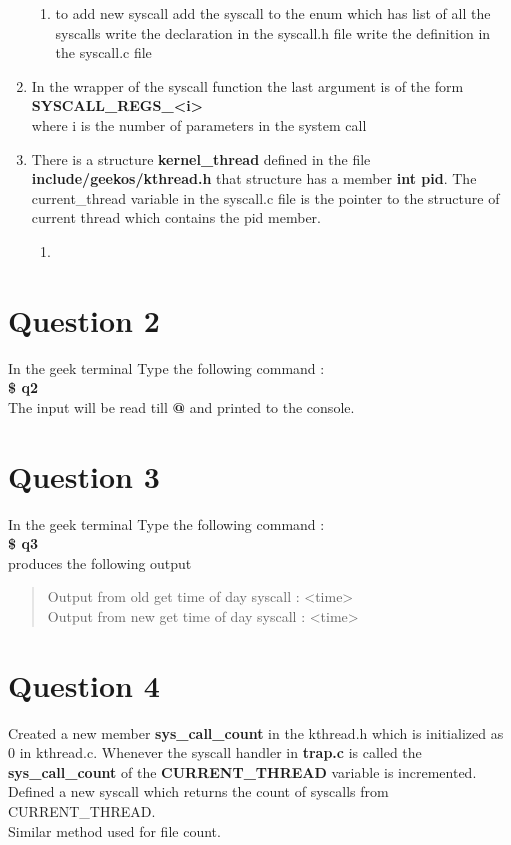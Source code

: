 \documentclass[11pt]{article}
\begin{document}
\begin{enumerate}
\begin{enumerate}
\item to add new syscall 
      add the syscall to the enum which has list of all the syscalls
      write the declaration in the syscall.h file
      write the definition in the syscall.c file
\end{enumerate}
\item In the wrapper of the syscall function the last argument is of the form \\
\textbf{SYSCALL\_{}REGS_<i>}   \\
     where i is the number of parameters in the system call
\item There is a structure \textbf{kernel\_{}thread} defined in the file \textbf{include/geekos/kthread.h}
     that structure has a member \textbf{int pid}. The current\_{}thread variable in the syscall.c
     file is the pointer to the structure of current thread which contains the pid member.
\begin{enumerate}
\item 
\end{enumerate}
\end{enumerate}
\section{Question 2}
\label{sec-2}

  In the geek terminal Type the following command : \\
  \textbf{\$ q2} \\
  The input will be read till \textbf{@} and printed to the console.
  
  
\section{Question 3}
\label{sec-3}

  In the geek terminal Type the following command : \\
  \textbf{\$ q3}\\
  produces the following output
\begin{quote}
Output from old get time of day syscall : <time> \\
Output from new get time of day syscall : <time>
\end{quote}
\section{Question 4}
\label{sec-4}

  Created a new member \textbf{sys\_{}call\_{}count} in the kthread.h
  which is initialized as 0 in kthread.c. Whenever the syscall handler
  in \textbf{trap.c} is called the \textbf{sys\_{}call\_{}count} of the \textbf{CURRENT\_{}THREAD}
  variable is incremented. Defined a new syscall which returns the count
  of syscalls from CURRENT\_{}THREAD.\\
  Similar method used for file count.
\end{document}
